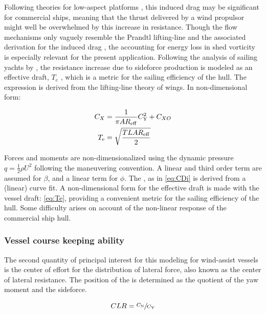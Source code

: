 \documentclass[twoside,twocolumn]{article}
\begin{document}
	Following theories for low-aspect platforms \cite{Hoerner1985,Jones1946}, this induced drag may be significant for commercial ships, meaning that the thrust delivered by a wind propulsor might well be overwhelmed by this increase in resistance. Though the flow mechanisms only vaguely resemble the Prandtl lifting-line and the associated derivation for the induced drag \cite{Prandtl1918}, the accounting for energy loss in shed vorticity is especially relevant for the present application. Following the analysis of sailing yachts by \citet{Gerritsma1992}, the resistance increase due to sideforce production is modeled as an effective draft, $T_{e}$ \cite{Gerritsma1993}, which is a metric for the sailing efficiency of the hull. The expression is derived from the lifting-line theory of wings. In non-dimensional form:
	
	\begin{subequations}
		\begin{align}
		C_{X}&=\frac{1}{\pi AR_\mathrm{eff}}C_\mathrm{Y}^2+C_{XO} 
		\label{eq:CDi}\\
		T_\mathrm{e}&=\sqrt{\dfrac{TLAR_\mathrm{eff}}{2}} 
		\label{eq:Te}
		\end{align}
	\end{subequations}
	
	\noindent
	Forces and moments are non-dimensionalized using the dynamic pressure $q=\frac{1}{2}\rho U^2 $ following the maneuvering convention. A linear and third order term are assumed for $\beta$, and a linear term for $\phi$. The \ARe, as in \cref{eq:CDi} is derived from a (linear) curve fit. A non-dimensional form for the effective draft \Te is made with the vessel draft: \TeT \cref{eq:Te}, providing a convenient metric for the sailing efficiency of the hull. Some difficulty arises on account of the non-linear response of the commercial ship hull.
	
	\subsubsection{Vessel course keeping ability}
	The second quantity of principal interest for this modeling for wind-assist vessels is the center of effort for the distribution of lateral force, also known as the center of lateral resistance. The position of the \CLR is determined as the quotient of the yaw moment and the sideforce.
	
	\begin{equation}
	CLR=\sfrac{C_\mathrm{N}}{C_\mathrm{Y}}
	\end{equation}
	
\end{document}

